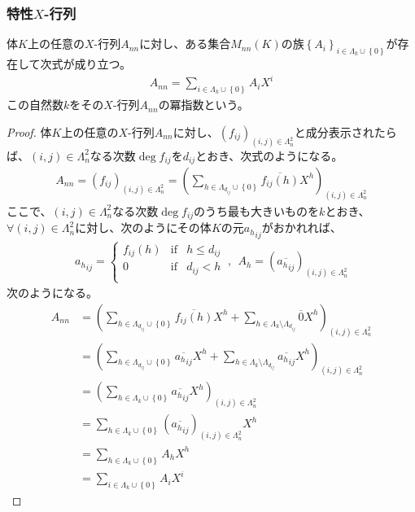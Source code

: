 \documentclass[dvipdfmx]{jsarticle}
\begin{document}
\subsubsection{特性$X$-行列}%
\begin{thm}\label{2.2.8.9}
体$K$上の任意の$X$-行列$A_{nn}$に対し、ある集合$M_{nn}(K)$の族$\left\{ A_{i} \right\}_{i \in \varLambda_{k} \cup \left\{ 0 \right\}}$が存在して次式が成り立つ。
\begin{align*}
A_{nn} = \sum_{i \in \varLambda_{k} \cup \left\{ 0 \right\}} {A_{i}X^{i}}
\end{align*}
この自然数$k$をその$X$-行列$A_{nn}$の冪指数という。
\end{thm}
\begin{proof}
体$K$上の任意の$X$-行列$A_{nn}$に対し、$\left( f_{ij} \right)_{(i,j) \in \varLambda_{n}^{2}}$と成分表示されたらば、$(i,j) \in \varLambda_{n}^{2}$なる次数$\deg f_{ij}$を$d_{ij}$とおき、次式のようになる。
\begin{align*}
A_{nn} = \left( f_{ij} \right)_{(i,j) \in \varLambda_{n}^{2}} = \left( \sum_{h \in \varLambda_{d_{ij}} \cup \left\{ 0 \right\}} {\overline{f_{ij}(h)}X^{h}} \right)_{(i,j) \in \varLambda_{n}^{2}}
\end{align*}
ここで、$(i,j) \in \varLambda_{n}^{2}$なる次数$\deg f_{ij}$のうち最も大きいものを$k$とおき、$\forall(i,j) \in \varLambda_{n}^{2}$に対し、次のようにその体$K$の元${a_{h}}_{ij}$がおかれれば、
\begin{align*}
{a_{h}}_{ij} = \left\{ \begin{matrix}
f_{ij}(h) & \mathrm{if} & h \leq d_{ij} \\
0 & \mathrm{if} & d_{ij} < h \\
\end{matrix} \right.\ ,\ \ A_{h} = \left( \overline{{a_{h}}_{ij}} \right)_{(i,j) \in \varLambda_{n}^{2}}
\end{align*}
次のようになる。
\begin{align*}
A_{nn} &= \left( \sum_{h \in \varLambda_{d_{ij}} \cup \left\{ 0 \right\}} {\overline{f_{ij}(h)}X^{h}} + \sum_{h \in \varLambda_{k} \setminus \varLambda_{d_{ij}}} {\overline{0}X^{h}} \right)_{(i,j) \in \varLambda_{n}^{2}}\\
&= \left( \sum_{h \in \varLambda_{d_{ij}} \cup \left\{ 0 \right\}} {\overline{{a_{h}}_{ij}}X^{h}} + \sum_{h \in \varLambda_{k} \setminus \varLambda_{d_{ij}}} {\overline{{a_{h}}_{ij}}X^{h}} \right)_{(i,j) \in \varLambda_{n}^{2}}\\
&= \left( \sum_{h \in \varLambda_{k} \cup \left\{ 0 \right\}} {\overline{{a_{h}}_{ij}}X^{h}} \right)_{(i,j) \in \varLambda_{n}^{2}}\\
&= \sum_{h \in \varLambda_{k} \cup \left\{ 0 \right\}} {\left( \overline{{a_{h}}_{ij}} \right)_{(i,j) \in \varLambda_{n}^{2}}X^{h}}\\
&= \sum_{h \in \varLambda_{k} \cup \left\{ 0 \right\}} {A_{h}X^{h}}\\
&= \sum_{i \in \varLambda_{k} \cup \left\{ 0 \right\}} {A_{i}X^{i}}
\end{align*}
\end{proof}
\end{document}

